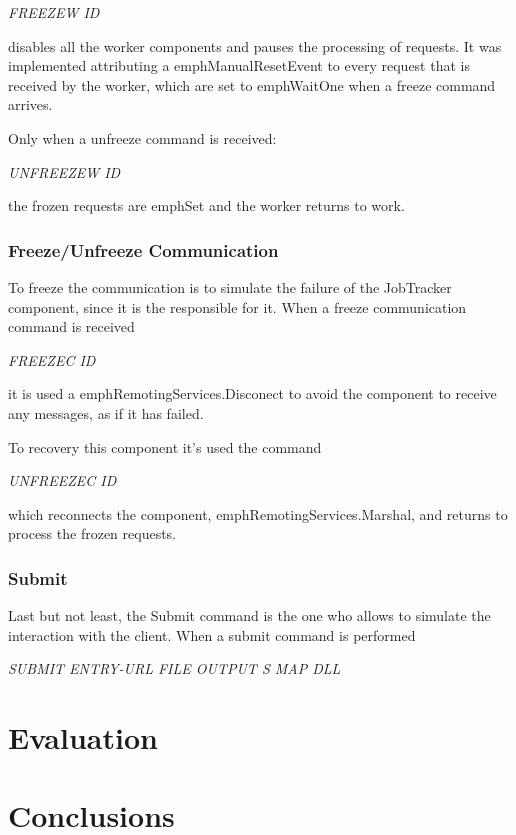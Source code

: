 \documentclass[times, 10pt,twocolumn]{article}
\begin{document}
            \emph{FREEZEW ID}
            
            disables all the worker components and pauses the processing of requests.
            It was implemented attributing a emph{ManualResetEvent} to every request that is received by the worker, which are set to emph{WaitOne} when a freeze command arrives.
            
            Only when a unfreeze command is received:
            
            \emph{UNFREEZEW ID}
            
            the frozen requests are emph{Set} and the worker returns to work.

            \subsubsection{Freeze/Unfreeze Communication}
            To freeze the communication is to simulate the failure of the JobTracker component, since it is the responsible for it. When a freeze communication command is received
            
	        \emph{FREEZEC ID}
	        
	        it is used a emph{RemotingServices.Disconect} to avoid the component to receive any messages, as if it has failed.
	        
	        To recovery this component it's used the command
	        
	        \emph{UNFREEZEC ID}
	        
	        which reconnects the component, emph{RemotingServices.Marshal}, and returns to process the frozen requests.
            
            \subsubsection{Submit}   
            Last but not least, the Submit command is the one who allows to simulate the interaction with the client. When a submit command is performed
            
            \emph{SUBMIT ENTRY-URL FILE OUTPUT S MAP DLL}
            
            
	
	\section{Evaluation}
	
	\section{Conclusions}
	
	
	
\end{document}
